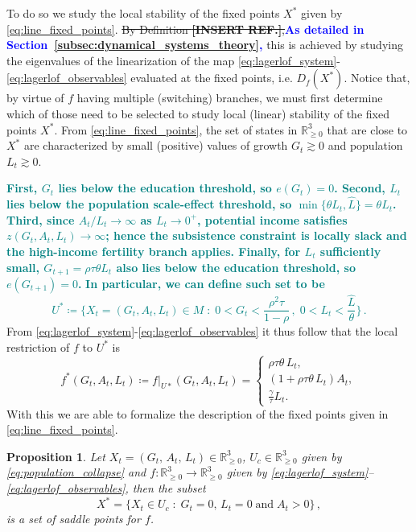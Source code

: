 \documentclass[a4paper,fleqn]{cas-sc}
\newtheorem{proposition}{Proposition}
\newcommand{\samb}[1]{\textcolor{blue}{\textbf{#1}}}
\newcommand{\greta}[1]{\textcolor{teal}{\textbf{#1}}}
\begin{document}
To do so we study the local stability of the fixed points $X^*$ given by \eqref{eq:line_fixed_points}.
\sout{By Definition \textbf{[INSERT REF.]},}\samb{As detailed in Section~\ref{subsec:dynamical_systems_theory},} this is achieved by studying the eigenvalues of the linearization of the map \eqref{eq:lagerlof_system}-\eqref{eq:lagerlof_observables} evaluated at the fixed points, i.e. $D_f(X^*)$.
Notice that, by virtue of $f$ having multiple (switching) branches, we must first determine which of those need to be selected to study local (linear) stability of the fixed points $X^*$.
From \eqref{eq:line_fixed_points}, the set of states in $\mathbb{R}^3_{\geq0}$ that are close to $X^*$ are characterized by small (positive) values of growth $G_t\gtrsim0$ and population $L_t\gtrsim0$.

\greta{First, $G_t$ lies below the education threshold, so $e(G_t)=0$. Second, $L_t$ lies below the population scale-effect threshold, so $\min\{\theta L_t,\hat L\}=\theta L_t$. Third, since $A_t/L_t\to\infty$ as $L_t\to0^+$, potential income satisfies $z(G_t,A_t,L_t)\to\infty$; hence the subsistence constraint is locally slack and the high-income fertility branch applies. 
Finally, for $L_t$ sufficiently small, $G_{t+1}=\rho\tau\theta L_t$ also lies below the education threshold, so $e(G_{t+1})=0$.}
\greta{In particular, we can define such set to be}
%
\greta{
\begin{equation*}
    U^*\coloneqq \bigg\{X_t=(G_t,A_t ,L_t)\in M\;:\;0<G_t<\frac{\rho^2\tau}{1-\rho}\,,\;0<L_t<\frac{\hat{L}}{\theta}\bigg\}\,.
\end{equation*}
}
%
From \eqref{eq:lagerlof_system}-\eqref{eq:lagerlof_observables} it thus follow that the local restriction of $f$ to $U^*$ is
%
\begin{equation}\label{eq:lagerlof_restricted}
    f^*(G_t,A_t,L_t)\coloneqq f|_{U*}(G_t,A_t,L_t)=
     \begin{cases} 
          \rho\tau\theta\,L_t, \\[6pt] 
          (1 + \rho\tau\theta\,L_t)A_t, \\[6pt] 
          \frac{\gamma}{\tau}L_t. 
     \end{cases} 
\end{equation}
%
With this we are able to formalize the description of the fixed points given in \eqref{eq:line_fixed_points}.
%
\begin{proposition}\label{prop:line_of_saddles}
    Let $X_t=(G_t,\,A_t,\,L_t)\in\mathbb{R}^3_{\geq0}$, $U_c\in\mathbb{R}^3_{\geq0}$ given by \eqref{eq:population_collapse} and $f:\mathbb{R}^3_{\geq0}\to\mathbb{R}^3_{\geq0}$ given by \eqref{eq:lagerlof_system}--\eqref{eq:lagerlof_observables}, then the subset
    \begin{equation}\label{eq:line_of_saddles}
        X^*=\{X_t\in U_c\;:\;G_t=0,\,L_t=0\;\text{and}\;A_t>0\}\,,
    \end{equation}
    is a set of saddle points for $f$.
\end{proposition}
\end{document}
